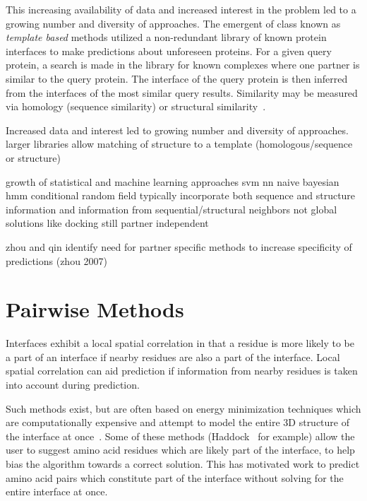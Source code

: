 This increasing availability of data and increased interest in the problem led to a growing number and diversity of approaches.
The emergent of class known as \textit{template based} methods utilized a non-redundant library of known protein interfaces to make predictions about unforeseen proteins.
For a given query protein, a search is made in the library for known complexes where one partner is similar to the query protein.
The interface of the query protein is then inferred from the interfaces of the most similar query results.
Similarity may be measured via homology (sequence similarity) or structural similarity~\cite{esmaielbeiki2015}.


Increased data and interest led to growing number and diversity of approaches.
	larger libraries allow matching of structure to a template (homologous/sequence or structure)
	
	growth of statistical and machine learning approaches
		svm
		nn
		naive bayesian
		hmm
		conditional random field
	typically incorporate both sequence and structure information and information from sequential/structural neighbors
	not global solutions like docking
	still partner independent
	
zhou and qin identify need for partner specific methods to increase specificity of predictions (zhou 2007)
		



\section{Pairwise Methods}




Interfaces exhibit a local spatial correlation in that a residue is more likely to be a part of an interface if nearby residues are also a part of the interface. 
Local spatial correlation can aid prediction if information from nearby residues is taken into account during prediction.


Such methods exist, but are often based on energy minimization techniques which are computationally expensive and attempt to model the entire 3D structure of the interface at once~\cite{esmaielbeiki2015}.
Some of these methods (Haddock~\cite{zundert2016} for example) allow the user to suggest amino acid residues which are likely part of the interface, to help bias the algorithm towards a correct solution.
This has motivated work to predict amino acid pairs which constitute part of the interface without solving for the entire interface at once. 




